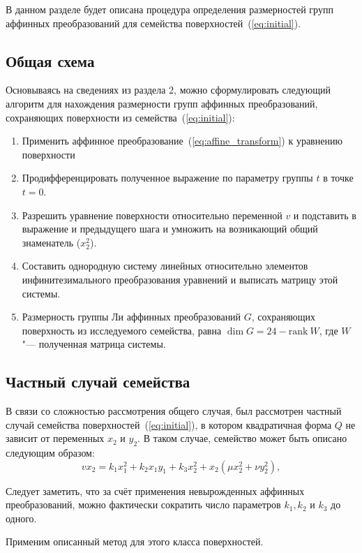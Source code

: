 \documentclass[../main.tex]{subfiles}
\begin{document}
В данном разделе будет описана процедура определения размерностей групп аффинных преобразований для семейства поверхностей~(\ref{eq:initial}).
\subsection{Общая схема}
Основываясь на сведениях из раздела 2, можно сформулировать следующий алгоритм для нахождения размерности групп аффинных преобразований, сохраняющих поверхности из семейства~(\ref{eq:initial}):
\begin{enumerate}
\item Применить аффинное преобразование~(\ref{eq:affine_transform}) к уравнению поверхности
\item Продифференцировать полученное выражение по параметру группы $t$ в точке $t = 0$.
\item Разрешить уравнение поверхности относительно переменной $v$ и подставить в выражение и предыдущего шага и умножить на возникающий общий знаменатель ($x_2^2$).
\item Составить однородную систему линейных относительно элементов инфинитезимального преобразования уравнений и выписать матрицу этой системы.
\item Размерность группы Ли аффинных преобразований $G$, сохраняющих поверхность из исследуемого семейства, равна $\dim G = 24 - \mathrm{rank}~W$, где $W$ "--- полученная матрица системы.
\end{enumerate}

\subsection{Частный случай семейства}
В связи со сложностью рассмотрения общего случая, был рассмотрен частный случай семейства поверхностей~(\ref{eq:initial}), в котором квадратичная форма $Q$ не зависит от переменных $x_2$ и $y_2$. В таком случае, семейство может быть описано следующим образом:
\begin{equation}\label{eq:special}
v x_2 = k_1 x_1^2 + k_2 x_1 y_1 + k_3 x_2^2 + x_2 (\mu x_2^2 + \nu y_2^2),
\end{equation}

Следует заметить, что за счёт применения невырожденных аффинных преобразований, можно фактически сократить число параметров $k_1, k_2$ и $k_3$ до одного.

Применим описанный метод для этого класса поверхностей.
\end{document}
